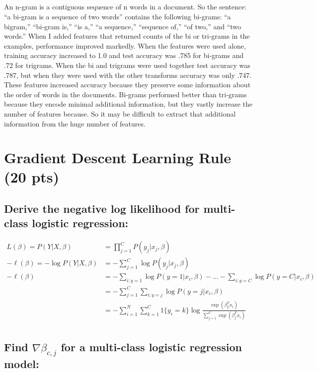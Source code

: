 \documentclass[11pt]{article}
\begin{document}
\subparagraph{}

An n-gram is a contiguous sequence of n words in a document. So the sentence: ``a bi-gram is a sequence of two words'' contains the following bi-grams: ``a bigram,'' ``bi-gram is,'' ``is a,'' ``a sequence,'' ``sequence of,'' ``of two,'' and ``two words.'' When I added features that returned counts of the bi or tri-grams in the examples, performance improved markedly. When the features were used alone, training accuracy increased to 1.0 and test accuracy was .785 for bi-grams and .72 for trigrams. When the bi and trigrams were used together test accuracy was .787, but when they were used with the other transforms accuracy was only .747. These features increased accuracy because they preserve some information about the order of words in the documents. Bi-grams performed better than tri-grams because they encode minimal additional information, but they vastly increase the number of features because. So it may be difficult to extract that additional information from the huge number of features.

\section{Gradient Descent Learning Rule (20 pts)}

\subsection{Derive the negative log likelihood for multi-class logistic regression:}

\begin{align*}
	L (\beta) = P(Y \vert X, \beta) &= \prod_{j = 1}^{C} P(y_{j} \vert x_{j}, \beta)\\
	-\ell(\beta) = -\log P(Y \vert X, \beta) &= -\sum_{j = 1}^{C} \log P(y_{j} \vert x_{j}, \beta)\\
	-\ell(\beta) &= -\sum_{i:y=1}\log P(y = 1 \vert x_{i}, \beta) - ... - \sum_{i:y=C}\log P(y = C \vert x_{i}, \beta)\\
	&= -\sum_{j = 1}^{C} \sum_{i:y=j} \log P(y = j \vert x_{i}, \beta)\\
	&= -\sum_{i = 1}^{N} \sum_{k=1}^{C} 1\{y_{i} = k\} \log \frac{\exp(\beta_{k}^{T}x_{i})}{\sum_{j=1}^{C}\exp(\beta_{j}^{T}x_{i})}\\
\end{align*}


\subsection{Find $\nabla \beta_{c,j}$ for a multi-class logistic regression model:}
\end{document}
